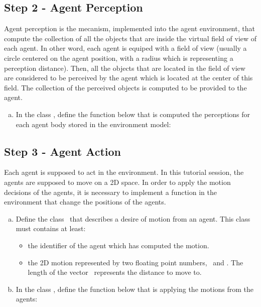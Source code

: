 \documentclass[english,nodocumentinfo,nopubpage]{utbmciadreport}
\begin{document}
\subsection{Step 2 - Agent Perception}

Agent perception is the mecanism, implemented into the agent environment, that compute the collection of all the objects that are inside the virtual field of view of each agent.
In other word, each agent is equiped with a field of view (usually a circle centered on the agent position, with a radius which is representing a perception distance). Then, all the objects that are located in the field of view are considered to be perceived by the agent which is located at the center of this field. The collection of the perceived objects is computed to be provided to the agent.

\begin{enumerate}[a)]
\item In the class , define the function below that is computed the perceptions for each agent body stored in the environment model:
	\begin{center}
	\end{center}
\end{enumerate}

\subsection{Step 3 - Agent Action}

Each agent is supposed to act in the environment. In this tutorial session, the agents are supposed to move on a 2D space. In order to apply the motion decisions of the agents, it is necessary to implement a function in the environment that change the positions of the agents.

\begin{enumerate}[a)]
\item Define the class \ that describes a desire of motion from an agent. This class must contains at least:
	\begin{itemize}
	\item the identifier of the agent which has computed the motion.
	\item the 2D motion represented by two floating point numbers, \ and . The length of the vector \ represents the distance to move to.
	\end{itemize}
\item In the class , define the function below that is applying the motions from the agents:
	\begin{center}
	\end{center}
\end{enumerate}
\end{document}
